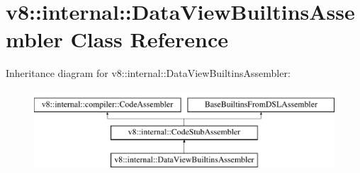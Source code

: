 \hypertarget{classv8_1_1internal_1_1DataViewBuiltinsAssembler}{}\section{v8\+:\+:internal\+:\+:Data\+View\+Builtins\+Assembler Class Reference}
\label{classv8_1_1internal_1_1DataViewBuiltinsAssembler}
Inheritance diagram for v8\+:\+:internal\+:\+:Data\+View\+Builtins\+Assembler\+:\begin{figure}[H]
\begin{center}
\leavevmode
\includegraphics[height=3.000000cm]{classv8_1_1internal_1_1DataViewBuiltinsAssembler}
\end{center}
\end{figure}

